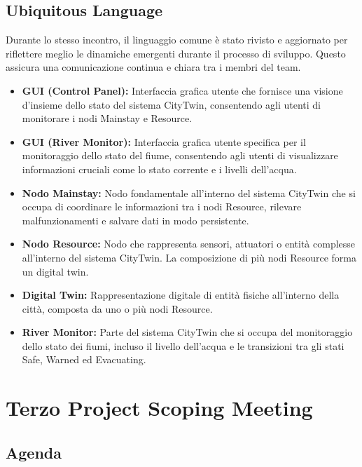 \subsection{Ubiquitous Language}

Durante lo stesso incontro, il linguaggio comune è stato rivisto e aggiornato per riflettere meglio le dinamiche emergenti durante il processo di sviluppo. Questo assicura una comunicazione continua e chiara tra i membri del team.

\begin{itemize}
    \item \textbf{GUI (Control Panel):} Interfaccia grafica utente che fornisce una visione d'insieme dello stato del sistema CityTwin, consentendo agli utenti di monitorare i nodi Mainstay e Resource.

    \item \textbf{GUI (River Monitor):} Interfaccia grafica utente specifica per il monitoraggio dello stato del fiume, consentendo agli utenti di visualizzare informazioni cruciali come lo stato corrente e i livelli dell'acqua.

    \item \textbf{Nodo Mainstay:} Nodo fondamentale all'interno del sistema CityTwin che si occupa di coordinare le informazioni tra i nodi Resource, rilevare malfunzionamenti e salvare dati in modo persistente.

    \item \textbf{Nodo Resource:} Nodo che rappresenta sensori, attuatori o entità complesse all'interno del sistema CityTwin. La composizione di più nodi Resource forma un digital twin.

    \item \textbf{Digital Twin:} Rappresentazione digitale di entità fisiche all'interno della città, composta da uno o più nodi Resource.

    \item \textbf{River Monitor:} Parte del sistema CityTwin che si occupa del monitoraggio dello stato dei fiumi, incluso il livello dell'acqua e le transizioni tra gli stati Safe, Warned ed Evacuating.

\end{itemize}

\section{Terzo Project Scoping Meeting}

\subsection{Agenda}

